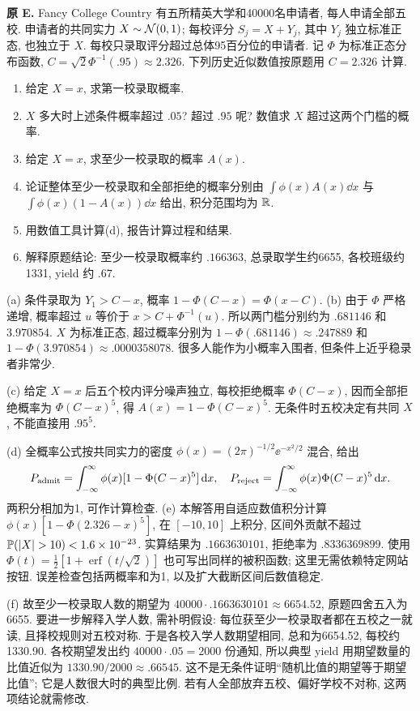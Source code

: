 \begin{exercise}\label{ex:P8.E}
\textbf{原 E.} Fancy College Country 有五所精英大学和40000名申请者, 每人申请全部五校. 申请者的共同实力 $X\sim\mathcal N(0,1)$; 每校评分 $S_j=X+Y_j$, 其中 $Y_j$ 独立标准正态, 也独立于 $X$. 每校只录取评分超过总体95百分位的申请者. 记 $\Phi$ 为标准正态分布函数, $C=\sqrt2\Phi^{-1}(.95)\approx2.326$. 下列历史近似数值按原题用 $C=2.326$ 计算.
\begin{enumerate}[label=(\alph*)]
\item\label{part:P8.E.a} 给定 $X=x$, 求第一校录取概率.
\item\label{part:P8.E.b} $X$ 多大时上述条件概率超过 $.05$? 超过 $.95$ 呢? 数值求 $X$ 超过这两个门槛的概率.
\item\label{part:P8.E.c} 给定 $X=x$, 求至少一校录取的概率 $A(x)$.
\item\label{part:P8.E.d} 论证整体至少一校录取和全部拒绝的概率分别由 $\int\phi(x)A(x)\dd x$ 与 $\int\phi(x)(1-A(x))\dd x$ 给出, 积分范围均为 $\mathbb R$.
\item\label{part:P8.E.e} 用数值工具计算(d), 报告计算过程和结果.
\item\label{part:P8.E.f} 解释原题结论: 至少一校录取概率约 $.166363$, 总录取学生约6655, 各校班级约1331, yield 约 $.67$.
\end{enumerate}
\end{exercise}
\begin{solution}\label{sol:P8.E}
(a) 条件录取为 $Y_1>C-x$, 概率 $1-\Phi(C-x)=\Phi(x-C)$. (b) 由于 $\Phi$ 严格递增, 概率超过 $u$ 等价于 $x>C+\Phi^{-1}(u)$. 所以两门槛分别约为 $.681146$ 和 $3.970854$. $X$ 为标准正态, 超过概率分别为 $1-\Phi(.681146)\approx.247889$ 和 $1-\Phi(3.970854)\approx.0000358078$. 很多人能作为小概率入围者, 但条件上近乎稳录者非常少.

(c) 给定 $X=x$ 后五个校内评分噪声独立, 每校拒绝概率 $\Phi(C-x)$, 因而全部拒绝概率为 $\Phi(C-x)^5$, 得 $A(x)=1-\Phi(C-x)^5$. 无条件时五校决定有共同 $X$, 不能直接用 $.95^5$.

(d) 全概率公式按共同实力的密度 $\phi(x)=(2\pi)^{-1/2}\ee^{-x^2/2}$ 混合, 给出
\[
 P_{\rm admit}=\int_{-\infty}^\infty\phi(x)[1-\Phi(C-x)^5]\,\mathrm d x,
 \quad P_{\rm reject}=\int_{-\infty}^\infty\phi(x)\Phi(C-x)^5\,\mathrm d x.
\]
两积分相加为1, 可作计算检查. (e) 本解答用自适应数值积分计算 $\phi(x)[1-\Phi(2.326-x)^5]$, 在 $[-10,10]$ 上积分, 区间外贡献不超过 $\Prob(|X|>10)<1.6\times10^{-23}$. 实算结果为 $.1663630101$, 拒绝率为 $.8336369899$. 使用 $\Phi(t)=\frac12[1+\operatorname{erf}(t/\sqrt2)]$ 也可写出同样的被积函数; 这里无需依赖特定网站按钮. 误差检查包括两概率和为1, 以及扩大截断区间后数值稳定.

(f) 故至少一校录取人数的期望为 $40000\cdot.1663630101\approx6654.52$, 原题四舍五入为6655. 要进一步解释入学人数, 需补明假设: 每位获至少一校录取者都在五校之一就读, 且择校规则对五校对称. 于是各校入学人数期望相同, 总和为6654.52, 每校约1330.90. 各校期望发出约 $40000\cdot.05=2000$ 份通知, 所以典型 yield 用期望数量的比值近似为 $1330.90/2000\approx.66545$. 这不是无条件证明“随机比值的期望等于期望比值”; 它是人数很大时的典型比例. 若有人全部放弃五校、偏好学校不对称, 这两项结论就需修改.
\end{solution}

